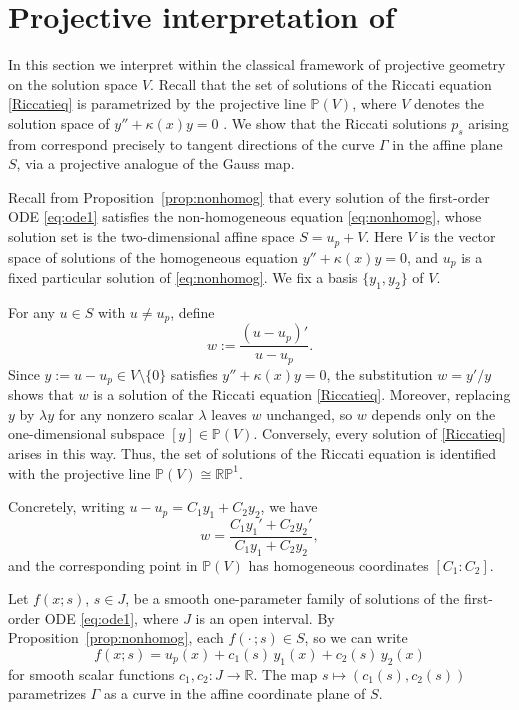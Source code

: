 \documentclass[preprint,a4paper]{elsarticle}
\begin{document}
\section{Projective interpretation of }\label{geometric_interpretation}

In this section we interpret  within the classical framework of projective geometry on the solution space $V$. Recall that the set of solutions of the Riccati equation \eqref{Riccatieq} is parametrized by the projective line $\mathbb{P}(V)$, where $V$ denotes the solution space of $y''+\kappa(x)y=0$ \cite{Ince1956,Reid1972}. We show that the Riccati solutions $p_s$ arising from  correspond precisely to tangent directions of the curve $\Gamma$ in the affine plane $S$, via a projective analogue of the Gauss map.

Recall from Proposition~\ref{prop:nonhomog} that every solution of the first-order ODE \eqref{eq:ode1} satisfies the non-homogeneous equation \eqref{eq:nonhomog}, whose solution set is the two-dimensional affine space $S=u_p+V$. Here $V$ is the vector space of solutions of the homogeneous equation $y''+\kappa(x)y=0$, and $u_p$ is a fixed particular solution of \eqref{eq:nonhomog}. We fix a basis $\{y_1,y_2\}$ of $V$.

For any $u\in S$ with $u\neq u_p$, define
\begin{equation}\label{eq:projectivization}
w:=\frac{(u-u_p)'}{u-u_p}.
\end{equation}
Since $y:=u-u_p\in V\setminus\{0\}$ satisfies $y''+\kappa(x)y=0$, the substitution $w=y'/y$ shows that $w$ is a solution of the Riccati equation \eqref{Riccatieq}. Moreover, replacing $y$ by $\lambda y$ for any nonzero scalar $\lambda$ leaves $w$ unchanged, so $w$ depends only on the one-dimensional subspace $[y]\in\mathbb{P}(V)$. Conversely, every solution of \eqref{Riccatieq} arises in this way. Thus, the set of solutions of the Riccati equation is identified with the projective line $\mathbb{P}(V)\cong\mathbb{RP}^1$.

Concretely, writing $u-u_p=C_1 y_1+C_2 y_2$, we have
\begin{equation}\label{eq:w_projcoords}
w=\frac{C_1 y_1'+C_2 y_2'}{C_1 y_1+C_2 y_2},
\end{equation}
and the corresponding point in $\mathbb{P}(V)$ has homogeneous coordinates $[C_1:C_2]$.

Let $f(x;s)$, $s\in J$, be a smooth one-parameter family of solutions of the first-order ODE \eqref{eq:ode1}, where $J$ is an open interval. By Proposition~\ref{prop:nonhomog}, each $f(\cdot\,;s)\in S$, so we can write
\[
f(x;s)=u_p(x)+c_1(s)\,y_1(x)+c_2(s)\,y_2(x)
\]
for smooth scalar functions $c_1,c_2:J\to\mathbb{R}$. The map $s\mapsto(c_1(s),c_2(s))$ parametrizes $\Gamma$ as a curve in the affine coordinate plane of $S$.
\end{document}

